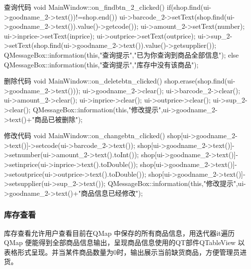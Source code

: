 \documentclass[
   projtype=report, %
   output=print,     %
  ]{nwafuprojrep}
\begin{document}
\begin{langCVOne}[C++][code1][QT]{查询代码}
void MainWindow::on_findbtn_2_clicked()
{
  if(shop.find(ui->goodname_2->text())!=shop.end())
  {
      ui->barcode_2->setText(shop.find(ui->goodname_2->text()).value()->getcode());
      ui->amount_2->setText(number);
      ui->inprice->setText(inprice);
      ui->outprice->setText(outprice);
      ui->sup_2->setText(shop.find(ui->goodname_2->text()).value()->getsupplier());
      QMessageBox::information(this,"查询提示","已为你查询到商品全部信息");
  }
  else
  {
      QMessageBox::information(this,"查询提示","库存中没有该商品");
  }
}
\end{langCVOne}
\begin{langCVOne}[C++][code2][QT]{删除代码}
void MainWindow::on_deletebtn_clicked()
{
    shop.erase(shop.find(ui->goodname_2->text()));
    ui->goodname_2->clear();
    ui->barcode_2->clear();
    ui->amount_2->clear();
    ui->inprice->clear();
    ui->outprice->clear();
    ui->sup_2->clear();
    QMessageBox::information(this,"修改提示",ui->goodname_2->text()+"商品已被删除");
}
\end{langCVOne}
\begin{langCVOne}[C++][code3][QT]{修改代码}
void MainWindow::on_changebtn_clicked()
{
    shop[ui->goodname_2->text()]->setcode(ui->barcode_2->text());
    shop[ui->goodname_2->text()]->setnumber(ui->amount_2->text().toInt());
    shop[ui->goodname_2->text()]->setinprice(ui->inprice->text().toDouble());
    shop[ui->goodname_2->text()]->setoutprice(ui->outprice->text().toDouble());
    shop[ui->goodname_2->text()]->setsupplier(ui->sup_2->text());
    QMessageBox::information(this,"修改提示",ui->goodname_2->text()+"商品信息已经修改");
}
\end{langCVOne}
\subsubsection{库存查看}
库存查看允许用户查看目前在QMap 中保存的所有商品信息，用迭代器it遍历QMap 便能得到全部商品信息输出，呈现商品信息使用的QT部件QTableView 以表格形式呈现。并当某件商品数量为0时，输出展示当前缺货商品，方便管理员进货。
\end{document}
